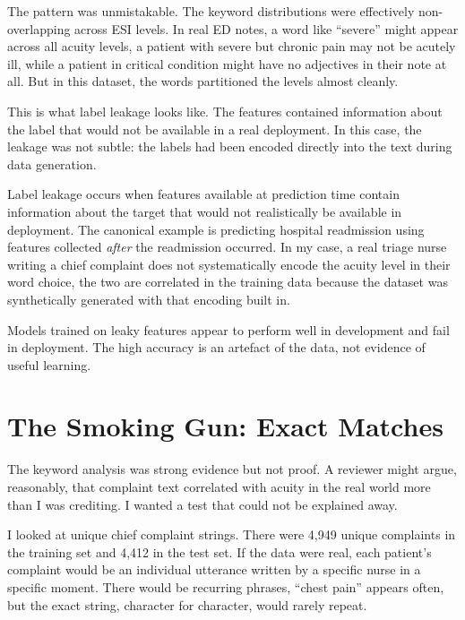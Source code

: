 The pattern was unmistakable. The keyword distributions were effectively non-overlapping across ESI levels. In real ED notes, a word like ``severe'' might appear across all acuity levels, a patient with severe but chronic pain may not be acutely ill, while a patient in critical condition might have no adjectives in their note at all. But in this dataset, the words partitioned the levels almost cleanly.

This is what label leakage looks like. The features contained information about the label that would not be available in a real deployment. In this case, the leakage was not subtle: the labels had been encoded directly into the text during data generation.

\begin{notebox}
Label leakage occurs when features available at prediction time contain information about the target that would not realistically be available in deployment. The canonical example is predicting hospital readmission using features collected \emph{after} the readmission occurred. In my case, a real triage nurse writing a chief complaint does not systematically encode the acuity level in their word choice, the two are correlated in the training data because the dataset was synthetically generated with that encoding built in.

Models trained on leaky features appear to perform well in development and fail in deployment. The high accuracy is an artefact of the data, not evidence of useful learning.
\end{notebox}

\section{The Smoking Gun: Exact Matches}

The keyword analysis was strong evidence but not proof. A reviewer might argue, reasonably, that complaint text correlated with acuity in the real world more than I was crediting. I wanted a test that could not be explained away.

I looked at unique chief complaint strings. There were 4,949 unique complaints in the training set and 4,412 in the test set. If the data were real, each patient's complaint would be an individual utterance written by a specific nurse in a specific moment. There would be recurring phrases, ``chest pain'' appears often, but the exact string, character for character, would rarely repeat.

